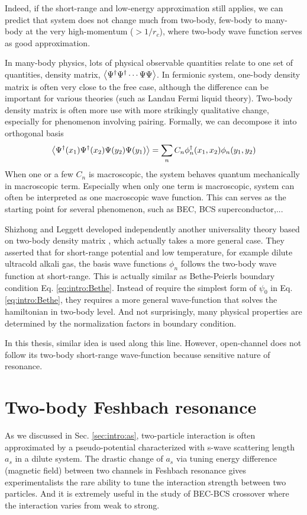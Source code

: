  Indeed, if the short-range and low-energy approximation still applies, we can predict that system  does not change much from two-body, few-body to many-body at the very high-momentum ($>1/r_{c}$), where two-body wave function serves as good approximation. 
 
 In many-body physics, lots of physical observable quantities relate to one set of  quantities, density matrix, $\bigl<{\Psi^{\dagger}\Psi^{\dagger}\cdots\Psi\Psi}\bigr>$. In fermionic system,  one-body density matrix is often very close to the free case, although the difference can be important for various theories (such as Landau Fermi liquid theory).  Two-body density matrix is often more use with more strikingly qualitative change, especially for phenomenon involving pairing. Formally, we can decompose it into orthogonal basis
 \begin{equation}
 \bigl<{\Psi^{\dagger}(x_1)\Psi^{\dagger}(x_2)\Psi(y_2)\Psi(y_1)}\bigr>=\sum_nC_n\phi_n^{\dagger}(x_1,x_2)\phi_n(y_1,y_2)
 \end{equation}     
 When one or a few $C_n$ is macroscopic, the system behaves quantum mechanically in macroscopic term.  Especially when only one term is macroscopic, system can often be interpreted as one macroscopic wave function.\cite{Leggett}  This can serves as the starting point for several phenomenon, such as BEC, BCS superconductor,...
 
Shizhong and Leggett developed independently another universality theory based on two-body density matrix \linebreak[2] \cite{shizhongUniv}, which actually takes a more general case.   They asserted that for short-range potential and low temperature, for example dilute ultracold alkali gas, the basis wave functions $\phi_n$ follows the two-body wave function at short-range. This is actually similar as Bethe-Peierls boundary condition Eq. \ref{eq:intro:Bethe}.  Instead of require the simplest form of $\psi_0$ in Eq. \eqref{eq:intro:Bethe}, they requires a more general wave-function that solves the  hamiltonian in two-body level.  And not surprisingly, many physical properties are determined by the normalization factors in boundary condition.  

In this thesis, similar idea is used along this line.  However, open-channel does not follow its two-body short-range wave-function because sensitive nature of resonance. 
 
 
 \section{Two-body Feshbach resonance\label{sec:intro:twobody}}
 As we discussed in Sec. \ref{sec:intro:as}, two-particle interaction is often approximated by a pseudo-potential characterized with s-wave scattering length $a_{s}$ in a dilute system.   The drastic  change  of $a_{s}$  via tuning energy difference (magnetic field) between two channels in Feshbach resonance gives  experimentalists the rare ability to tune the interaction strength between two particles.  And it is extremely useful in the study of BEC-BCS crossover where the interaction varies from weak to strong.  
 
